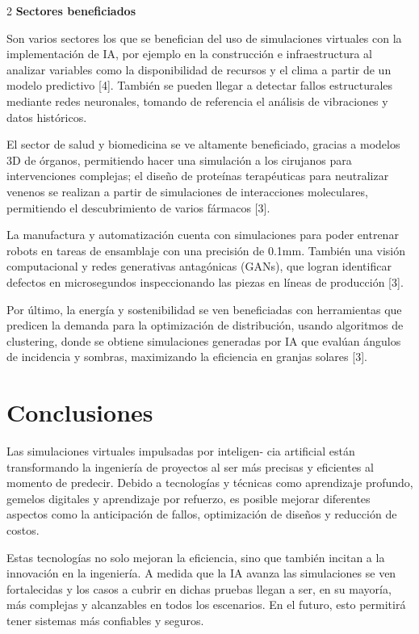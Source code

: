 \documentclass[12pt,spanish,Letterpaper,openany]{book}
\begin{document}
\begin {multicols}{2}
\textbf{Sectores beneficiados}

Son varios sectores los que se benefician del uso de simulaciones virtuales con la implementación de IA, por ejemplo en la construcción e infraestructura al analizar variables como la disponibilidad de recursos y el clima a partir de un modelo predictivo {[}4{]}. También se pueden llegar a detectar fallos estructurales mediante redes neuronales, tomando de referencia el análisis de vibraciones y datos históricos.

El sector de salud y biomedicina se ve altamente beneficiado, gracias a modelos 3D de órganos, permitiendo hacer una simulación a los cirujanos para intervenciones complejas; el diseño de proteínas terapéuticas para neutralizar venenos se realizan a partir de simulaciones de interacciones moleculares, permitiendo el descubrimiento de varios fármacos {[}3{]}.

La manufactura y automatización cuenta con simulaciones para poder entrenar robots en tareas de ensamblaje con una precisión de 0.1mm. También una visión computacional y redes generativas antagónicas (GANs), que logran identificar defectos en microsegundos inspeccionando las piezas en líneas de producción {[}3{]}.

Por último, la energía y sostenibilidad se ven beneficiadas con herramientas que predicen la demanda para la optimización de distribución, usando algoritmos de clustering, donde se obtiene simulaciones generadas por IA que evalúan ángulos de incidencia y sombras, maximizando la eficiencia en granjas solares {[}3{]}.

\hypertarget{conclusiones-4}{%
\section{Conclusiones}\label{conclusiones-4}}

Las simulaciones virtuales impulsadas por inteligen-
cia artificial están transformando la ingeniería de proyectos al ser más precisas y eficientes al momento de predecir. Debido a tecnologías y técnicas como aprendizaje profundo, gemelos digitales y aprendizaje por refuerzo, es posible mejorar diferentes aspectos como la anticipación de fallos, optimización de diseños y reducción de costos.

Estas tecnologías no solo mejoran la eficiencia, sino que también incitan a la innovación en la ingeniería. A medida que la IA avanza las simulaciones se ven fortalecidas y los casos a cubrir en dichas pruebas llegan a ser, en su mayoría, más complejas y alcanzables en todos los escenarios. En el futuro, esto permitirá tener sistemas más confiables y seguros.


\end{multicols}
\end{document}
